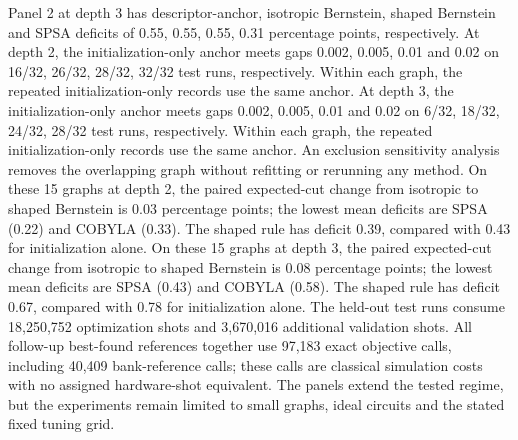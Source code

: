 Panel 2 at depth 3 has descriptor-anchor, isotropic Bernstein, shaped Bernstein and SPSA deficits of 0.55, 0.55, 0.55, 0.31 percentage points, respectively.
At depth 2, the initialization-only anchor meets gaps 0.002, 0.005, 0.01 and 0.02 on 16/32, 26/32, 28/32, 32/32 test runs, respectively. Within each graph, the repeated initialization-only records use the same anchor.
At depth 3, the initialization-only anchor meets gaps 0.002, 0.005, 0.01 and 0.02 on 6/32, 18/32, 24/32, 28/32 test runs, respectively. Within each graph, the repeated initialization-only records use the same anchor.
An exclusion sensitivity analysis removes the overlapping graph without refitting or rerunning any method.
On these 15 graphs at depth 2, the paired expected-cut change from isotropic to shaped Bernstein is 0.03 percentage points; the lowest mean deficits are SPSA (0.22) and COBYLA (0.33). The shaped rule has deficit 0.39, compared with 0.43 for initialization alone.
On these 15 graphs at depth 3, the paired expected-cut change from isotropic to shaped Bernstein is 0.08 percentage points; the lowest mean deficits are SPSA (0.43) and COBYLA (0.58). The shaped rule has deficit 0.67, compared with 0.78 for initialization alone.
The held-out test runs consume 18,250,752 optimization shots and 3,670,016 additional validation shots. All follow-up best-found references together use 97,183 exact objective calls, including 40,409 bank-reference calls; these calls are classical simulation costs with no assigned hardware-shot equivalent. The panels extend the tested regime, but the experiments remain limited to small graphs, ideal circuits and the stated fixed tuning grid.
